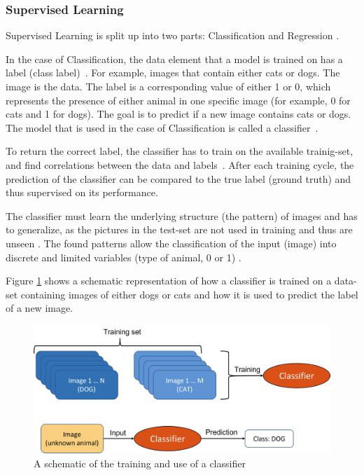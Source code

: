 \subsubsection*{Supervised Learning}\label{SUPER}
Supervised Learning is split up into two parts: Classification and Regression \cite{Janiesch,Theodoridis}.

In the case of Classification, the data element that a model is trained on has a label (class label)~\cite{Carleo}. For example, images that contain either cats or dogs. The image is the data. The label is a corresponding value of either 1 or 0, which represents the presence of either animal in one specific image (for example, 0 for cats and 1 for dogs). The goal is to predict if a new image contains cats or dogs. The model that is used in the case of Classification is called a classifier~\cite{Theodoridis}.

To return the correct label, the classifier has to train on the available trainig-set, and find correlations between the data and labels~\cite{Carleo}.
After each training cycle, the prediction of the classifier can be compared to the true label (ground truth) and thus supervised on its performance.

The classifier must learn the underlying structure (the pattern) of images and has to generalize, as the pictures in the test-set are not used in training and thus are unseen \cite{Bishop}. 
The found patterns allow the classification of the input (image) into discrete and limited variables (type of animal, 0 or 1) \cite{Theodoridis}.

Figure \ref{fig:CATDOG} shows a schematic representation of how a classifier is trained on a data-set containing images of either dogs or cats and how it is used to predict the label of a new image.

\begin{figure}[H]
	\centering
	\includegraphics[width=0.9\linewidth]{IMGs/CATDOG.png}
	\caption{A schematic of the training and use of a classifier}
	\label{fig:CATDOG}
\end{figure}



